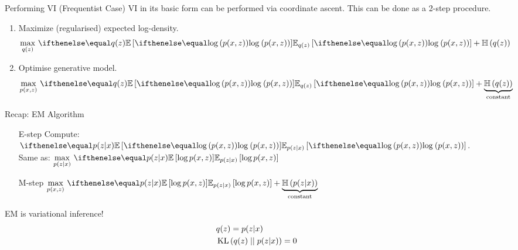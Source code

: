 \documentclass[14pt]{beamer}
\begin{document}
\begin{frame}{Performing VI (Frequentist Case)}
VI in its basic form can be performed via coordinate ascent. This can be done as a 2-step procedure.
\begin{enumerate}
\pause
\item Maximize (regularised) expected log-density.
\begin{equation*}
\underset{q(z)}{\max}~\E[q(z)]{\loga{p(x,z)}} + \Ent{q(z)}
\end{equation*}
\pause
\item Optimise generative model.
\begin{equation*}
\underset{p(x,z)}{\max}~ \E[q(z)]{\loga{p(x,z)}} + \underbrace{\Ent{q(z)}}_{\text{constant}}
\end{equation*}
\end{enumerate}
\end{frame}

\begin{frame}{Recap: EM Algorithm}
\begin{itemize}
\item[\alert{E-step}] Compute: $ \E[p(z|x)]{\loga{p(x,z)}} $. \\ Same as: $ \underset{p(z|x)}{\max}~ \E[p(z|x)]{\log p(x,z)} $
\item[\alert{M-step}] $ \underset{p(x,z)}{\max}~\E[p(z|x)]{\log p(x,z)} + \underbrace{\Ent{p(z|x)}}_{\text{constant}} $
\end{itemize}
\pause 
\begin{block}{EM is variational inference!}
\begin{align*}
&q(z) = p(z|x) \\
&\operatorname{KL}\left(q(z)\mid\mid p(z|x)\right) = 0
\end{align*}
\end{block}
\end{frame}
\end{document}
